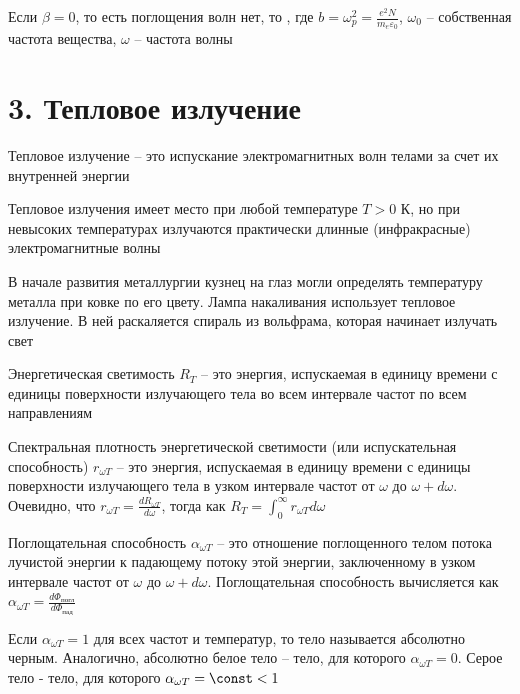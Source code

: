 Если $\beta = 0$, то есть поглощения волн нет, то , где $b = \omega_p^2 = \frac{e^2 N}{m_e \varepsilon_0}$, $\omega_0$ -- собственная частота вещества, $\omega$ -- частота волны


\section{3. Тепловое излучение}

Тепловое излучение -- это испускание электромагнитных волн телами за счет их внутренней энергии

Тепловое излучения имеет место при любой температуре $T > 0$ К, но при невысоких температурах излучаются практически длинные (инфракрасные) электромагнитные волны

В начале развития металлургии кузнец на глаз могли определять температуру металла при ковке по его цвету. Лампа накаливания использует тепловое излучение. В ней раскаляется спираль из вольфрама, которая начинает излучать свет

Энергетическая светимость $R_{T}$ -- это энергия, испускаемая в единицу времени с единицы поверхности излучающего тела во всем интервале частот по всем направлениям

Спектральная плотность энергетической светимости (или испускательная способность) $r_{\omega T}$ -- это энергия, испускаемая в единицу времени с единицы поверхности излучающего тела в узком интервале частот от $\omega$ до $\omega + d \omega$. Очевидно, что $r_{\omega T} = \frac{d R_{\omega T}}{d \omega}$, тогда как $R_T = \int_0^\infty r_{\omega T} d\omega$

Поглощательная способность $\alpha_{\omega T}$ -- это отношение поглощенного телом потока лучистой энергии к падающему потоку этой энергии, заключенному в узком интервале частот от $\omega$ до $\omega + d\omega$. Поглощательная способность вычисляется как $\alpha_{\omega T} = \frac{d \Phi_{\text{погл}}}{d \Phi_{\text{пад}}}$

Если $\alpha_{\omega T} = 1$ для всех частот и температур, то тело называется абсолютно черным. Аналогично, абсолютно белое тело -- тело, для которого $\alpha_{\omega T} = 0$. Серое тело - тело, для которого $\alpha_{\omega T} = \const < 1$

\mediumvspace


